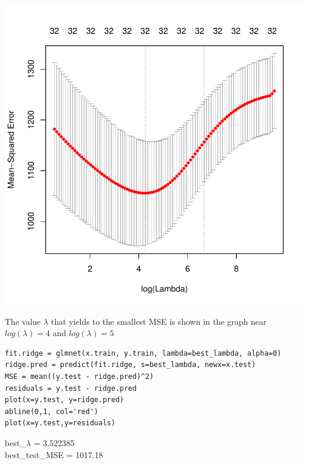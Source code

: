 \documentclass[]{report}
\begin{document}
\begin{center}
	\includegraphics{Figures/cv_glmnet.pdf}
\end{center}

The value $\lambda$ that yields to the smallest MSE is shown in the graph near $log(\lambda)=4$ and $log(\lambda)=5 $


\begin{lstlisting}
fit.ridge = glmnet(x.train, y.train, lambda=best_lambda, alpha=0)
ridge.pred = predict(fit.ridge, s=best_lambda, newx=x.test)
MSE = mean((y.test - ridge.pred)^2)
residuals = y.test - ridge.pred
plot(x=y.test, y=ridge.pred)
abline(0,1, col='red')
plot(x=y.test,y=residuals)
\end{lstlisting}

\begin{center} 
	best\_$\lambda$ = 3.522385 \\
	best\_test\_MSE = 1017.18
\end{center} 
\end{document}
